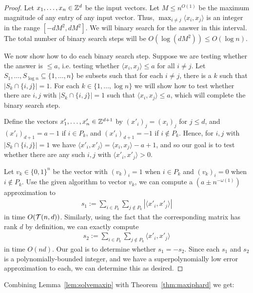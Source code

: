 \begin{proof}
Let $x_1, \ldots, x_n \in {\mathbb Z}^d$ be the input vectors. Let $M \leq n^{O(1)}$ be the maximum magnitude of any entry of any input vector. Thus, $\max_{i \neq j} \langle x_i, x_j \rangle$ is an integer in the range $[-dM^2, dM^2]$. We will binary search for the answer in this interval. The total number of binary search steps will be $O(\log(dM^2)) \leq O(\log n)$.

We now show how to do each binary search step. Suppose we are testing whether the answer is $\leq a$, i.e. testing whether $\langle x_i, x_j \rangle \leq a$ for all $i \neq j$. Let $S_1, \ldots, S_{\log n} \subseteq \{ 1, \ldots, n \}$ be subsets such that for each $i \neq j$, there is a $k$ such that $|S_k \cap \{i,j\}| = 1$. For each $k \in \{1, \ldots, \log n\}$ we will show how to test whether there are $i,j$ with $|S_k \cap \{i,j\}| = 1$ such that $\langle x_i, x_j \rangle \leq a$, which will complete the binary search step.

Define the vectors $x'_1, \ldots, x'_n \in {\mathbb Z}^{d+1}$ by $(x'_i)_{j} = (x_i)_{j}$ for $j \leq d$, and $(x'_i)_{d+1} = a-1$ if $i \in P_k$, and $(x'_i)_{d+1} = -1$ if $i \notin P_k$. Hence, for  $i,j$ with $|S_k \cap \{i,j\}| = 1$ we have $\langle x'_i, x'_j \rangle = \langle x_i, x_j \rangle - a+1$, and so our goal is to test whether there are any such $i,j$ with $\langle x'_i, x'_j \rangle > 0$.

Let $v_k \in \{0,1\}^n$ be the vector with $(v_k)_{i} = 1$ when $i \in P_k$ and $(v_k)_{i} = 0$ when $i \notin P_k$. Use the given algorithm to vector $v_k$, we can compute a $(a \pm n^{-\omega(1)})$ approximation to 
\begin{align*}
s_1 := \sum_{i \in P_k} \sum_{j \notin P_k} |\langle x'_i, x'_j \rangle|
\end{align*}
in time $O(\mathcal{T}(n,d))$. Similarly, using the fact that the corresponding matrix has rank $d$ by definition, we can exactly compute 
\begin{align*}
s_2 := \sum_{i \in P_k} \sum_{j \notin P_k} \langle x'_i, x'_j \rangle
\end{align*}
in time $O(nd)$. Our goal is to determine whether $s_1 = -s_2$. Since each $s_1$ and $s_2$ is a polynomially-bounded integer, and we have a superpolynomially low error approximation to each, we can determine this as desired.
\end{proof}

Combining Lemma~\ref{lem:solvemaxip} with Theorem~\ref{thm:maxiphard} we get:


